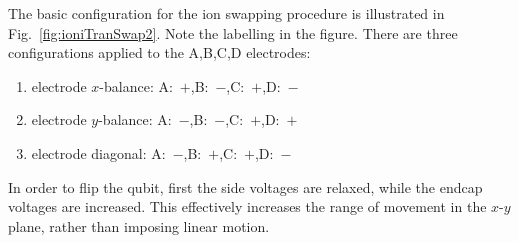 \documentclass[12pt,a4paper]{amsart}
\numberwithin{equation}{section}
\theoremstyle{plain}
\theoremstyle{definition}
\begin{document}
The basic configuration for the ion swapping procedure is illustrated in Fig.~\ref{fig:ioniTranSwap2}. Note the labelling in the figure. There are three configurations applied to the A,B,C,D electrodes:
\begin{enumerate}
\item electrode $x$-balance: A:\ $+$,\quad B:\ $-$,\quad C:\ $+$,\quad D:\ $-$
\item electrode $y$-balance: A:\ $-$,\quad B:\ $-$,\quad C:\ $+$,\quad D:\ $+$
\item electrode diagonal: A:\ $-$,\quad B:\ $+$,\quad C:\ $+$,\quad D:\ $-$
\end{enumerate}
In order to flip the qubit, first the side voltages are relaxed, while the endcap voltages are increased. This effectively increases the range of movement in the $x$-$y$ plane, rather than imposing linear motion.
\end{document}
